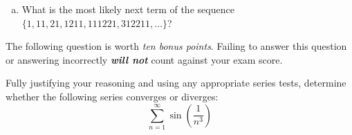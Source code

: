 \documentclass[12pt,letterpaper]{exam}
\begin{document}
\begin{questions}
\begin{enumerate}[(a)]
	\item What is the most likely next term of the sequence $\{ 1, 11, 21, 1211, 111221, 312211, \ldots \}$? \par\vspace{0.5cm} \underline{ \hspace{2cm} \phantom{$13112221$} \hspace{2cm}}
	\end{enumerate} \par\vspace{0.5cm}
	
 The following question is worth \textit{ten bonus points}. Failing to answer this question or answering incorrectly \textit{\bfseries will not} count against your exam score. \par\vspace{0.3cm} 

Fully justifying your reasoning and using any appropriate series tests, determine whether the following series converges or diverges:	
	\[
	\sum_{n=1}^\infty \sin \left( \dfrac{1}{n^3} \right)
	\] 

\end{questions}
\end{document}
